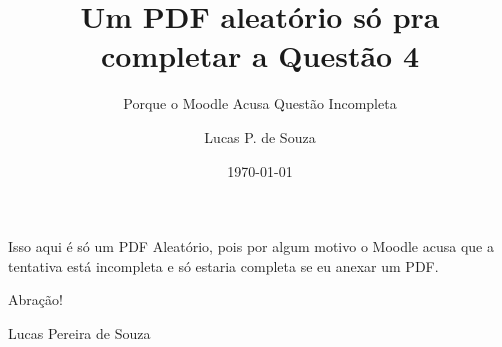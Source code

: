 \documentclass[letterpaper,12pt]{scrartcl}
\renewcommand{\=}[1]{\stackrel{#1}{=}} %
\theoremstyle{definition}
\theoremstyle{remark}
\begin{document}
	
	\title{Um PDF aleatório só pra completar a Questão 4}
	\subtitle{Porque o Moodle Acusa Questão Incompleta}
	\author{Lucas P. de Souza}
	\date{\today}
	
	\maketitle
	
	Isso aqui é só um PDF Aleatório, pois por algum motivo o Moodle acusa que a tentativa está incompleta e só estaria completa se eu anexar um PDF.
	
	Abração!
	
	Lucas Pereira de Souza
\end{document}
